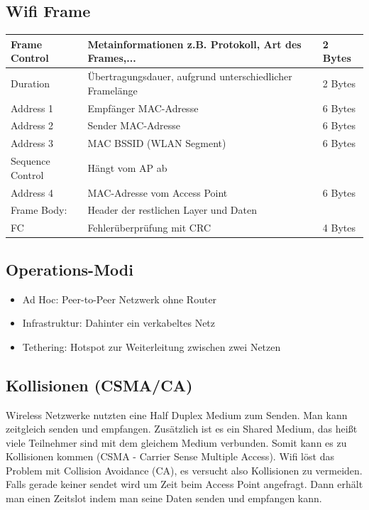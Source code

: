 \subsection*{Wifi Frame}
\begin{tabular}{|l|l|l|}
	\hline
	Frame Control & Metainformationen z.B. Protokoll, Art des Frames,... & 2 Bytes \\
	\hline
	Duration & Übertragungsdauer, aufgrund unterschiedlicher Framelänge & 2 Bytes \\
	\hline
	Address 1 & Empfänger MAC-Adresse & 6 Bytes \\
	\hline
	Address 2 & Sender MAC-Adresse & 6 Bytes \\
	\hline
	Address 3 & MAC BSSID (WLAN Segment) & 6 Bytes \\
	\hline
	Sequence Control & Hängt vom AP ab &  \\
	\hline
	Address 4 & MAC-Adresse vom Access Point & 6 Bytes \\
	\hline
	Frame Body: & Header der restlichen Layer und Daten & \\
	\hline
	FC& Fehlerüberprüfung mit CRC & 4 Bytes \\
	\hline
\end{tabular}

\subsection*{Operations-Modi}
\begin{itemize}
	\item Ad Hoc: Peer-to-Peer Netzwerk ohne Router
	\item Infrastruktur: Dahinter ein verkabeltes Netz
	\item Tethering: Hotspot zur Weiterleitung zwischen zwei Netzen 
\end{itemize}

\subsection*{Kollisionen (CSMA/CA)}
Wireless Netzwerke nutzten eine Half Duplex Medium zum Senden. Man kann zeitgleich senden und empfangen. Zusätzlich ist es ein Shared Medium, das heißt viele Teilnehmer sind mit dem gleichem Medium verbunden. Somit kann es zu Kollisionen kommen (CSMA - Carrier Sense Multiple Access). Wifi löst das Problem mit Collision Avoidance (CA), es versucht also Kollisionen zu vermeiden. Falls gerade keiner sendet wird um Zeit beim Access Point angefragt. Dann erhält man einen Zeitslot indem man seine Daten senden und empfangen kann.


